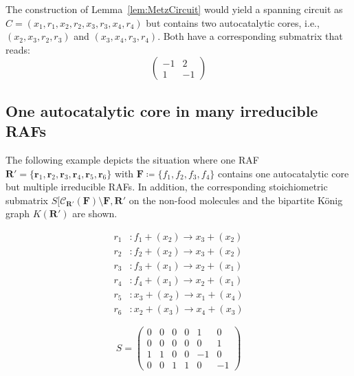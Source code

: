 \documentclass[pdflatex]{sn-jnl}
\theoremstyle{thmstyleone}%
\theoremstyle{examplesty}%
\theoremstyle{thmstylethree}%
\newcommand{\king}{K}
\newcommand{\food}{\ensuremath{\mathbf{F}}}
\newcommand{\SM}{S}
\newcommand{\closure}[2]{\mathscr{C}_{#1}(#2)}
\newcommand{\fr}[0]{\mathbf{r}}
\newcommand{\RAF}[0]{\mathbf{R}'}
\begin{document}
The construction of Lemma~\ref{lem:MetzCircuit} would yield a spanning
circuit as $C=(x_1,r_1,x_2,r_2,x_3,r_3,x_4, r_4)$ but contains two
autocatalytic cores, i.e., $({x_2,x_3},{r_2,r_3})$ and $({x_3,x_4},
{r_3,r_4})$. Both have a corresponding submatrix that reads:
\begin{equation}
  \begin{pmatrix}
    -1 & 2 \\
    1  & -1
  \end{pmatrix}
\end{equation}

\subsection{One autocatalytic core in many irreducible RAFs}
\label{subsec:ManyRAFsOneCore}

The following example depicts the situation where one RAF
$\RAF=\{\fr_1,\fr_2,\fr_3,\fr_4,\fr_5,\fr_6\}$ with $\food\coloneqq
\{f_1,f_2,f_3,f_4\}$ contains one autocatalytic core but multiple
irreducible RAFs.  In addition, the corresponding stoichiometric submatrix
$\SM[\closure{\RAF}{\food}\setminus \food,\RAF$ on the non-food molecules
  and the bipartite K\"onig graph $\king(\RAF)$ are shown.

\begin{minipage}[c]{0.5\textwidth}
  \begin{equation}
    \begin{split}
      r_1&: f_1  + (x_2) \rightarrow x_3 + (x_2) \\
      r_2&: f_2  + (x_2) \rightarrow x_3 + (x_2) \\
      r_3&: f_3  + (x_1) \rightarrow x_2 + (x_1) \\			
      r_4&: f_4  + (x_1) \rightarrow x_2 + (x_1) \\
      r_5&: x_3 + (x_2) \rightarrow x_1 + (x_4) \\
      r_6&: x_2 + (x_3) \rightarrow x_4 + (x_3) 
    \end{split}
  \end{equation}
\end{minipage}%
\hfill%
\begin{minipage}[c]{0.5\textwidth}
  \begin{equation*}
    \SM=
    \begin{pmatrix}
      0 & 0  &  0 & 0 & 1  & 0 \\
      0 & 0  &  0 & 0 & 0  & 1 \\
      1 & 1  &  0 & 0 & -1 & 0 \\
      0 & 0  &  1 & 1 & 0  & -1 
    \end{pmatrix}
  \end{equation*}	
\end{minipage}
\end{document}
